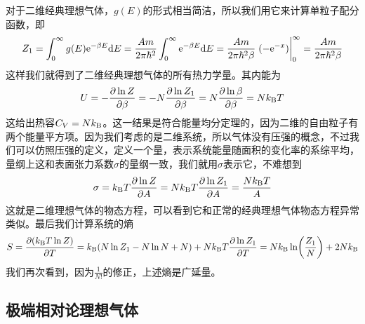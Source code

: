 \documentclass[../../main.tex]{subfiles}
\begin{document}
对于二维经典理想气体，\(g(E)\)的形式相当简洁，所以我们用它来计算单粒子配分函数，即
\begin{equation}
    Z_1=\int_0^{\infty}g(E)\e^{-\beta E}\dd E=\frac{Am}{2\pi\hbar^2}\int_0^{\infty}\e^{-\beta E}\dd E=\frac{Am}{2\pi\hbar^2\beta}\eval{(-\e^{-x})}_{0}^{\infty}=\frac{Am}{2\pi\hbar^2\beta}
\end{equation}
这样我们就得到了二维经典理想气体的所有热力学量。其内能为
\begin{equation}
    U=-\pdv{\ln Z}{\beta}=-N\pdv{\ln Z_1}{\beta}=N\pdv{\ln\beta}{\beta}=Nk_{\mathrm{B}} T
\end{equation}
这给出热容\(C_V=Nk_{\mathrm{B}}\)。这一结果是符合能量均分定理的，因为二维的自由粒子有两个能量平方项。因为我们考虑的是二维系统，所以气体没有压强的概念，不过我们可以仿照压强的定义，定义一个量，表示系统能量随面积的变化率的系综平均，量纲上这和表面张力系数\(\sigma\)的量纲一致，我们就用\(\sigma\)表示它，不难想到
\begin{equation}
    \sigma=k_{\mathrm{B}} T\pdv{\ln Z}{A}=Nk_{\mathrm{B}} T\pdv{\ln Z_1}{A}=\frac{Nk_{\mathrm{B}} T}{A}
\end{equation}
这就是二维理想气体的物态方程，可以看到它和正常的经典理想气体物态方程异常类似。最后我们计算系统的熵
\begin{equation}
    S=\pdv{(k_{\mathrm{B}}T\ln Z)}{T}=k_{\mathrm{B}}(N\ln Z_1-N\ln N+N)+Nk_{\mathrm{B}} T\pdv{\ln Z_1}{T}=Nk_{\mathrm{B}}\ln(\frac{Z_1}{N})+2Nk_{\mathrm{B}}
\end{equation}
我们再次看到，因为\(\frac{1}{N!}\)的修正，上述熵是广延量。

\subsection{极端相对论理想气体}\label{subsec:极端相对论理想气体}
\end{document}
